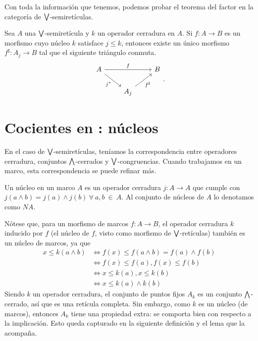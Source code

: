 Con toda la información que tenemos,
podemos probar el teorema del factor
en la categoría de $\bigvee$-semiretículas.
\begin{thm}
    Sea $A$ una $\bigvee$-semiretícula y $k$ un operador cerradura en $A$.
    Si $f:A\to B$ es un morfismo cuyo núcleo $k$ satisface $j\leq k$,
    entonces existe un único morfismo $f^\sharp:A_j\to B$ tal que
    el siguiente triángulo conmuta.
    \[
        \begin{tikzcd}
            A \ar[rr,"f"] \ar[dr,"j^*"'] &&  B \\
            &A_j \ar[ur,"f^\sharp"']
        \end{tikzcd}
    .\]
\end{thm}
    

\section{Cocientes en : núcleos}
En el caso de $\bigvee$-semiretículas, teníamos la correspondencia
entre operadores cerradura, conjuntos $\bigwedge$-cerrados
y $\bigvee$-congruencias.
Cuando trabajamos en un marco, esta correspondencia se puede refinar
más.

\begin{defn}
\label{def:nucleo}
Un núcleo en un marco $A$ es un operador cerradura $j:A \to A$ que cumple con $j(a\wedge b)=j(a)\wedge j(b) \ \forall \ a,b \ \in \ A$.
Al conjunto de núcleos de $A$ lo denotamos como $NA$.
\end{defn}

Nótese que, para un morfismo de marcos $f: A\to B$, el operador
cerradura $k$ inducido por $f$ (el núcleo de $f$, visto como morfismo
de $\bigvee$-retículas) también es un núcleo de marcos, ya que
\begin{align*}
x\leq k(a\wedge b)&\iff f(x)\leq f(a\wedge b)=f(a)\wedge f(b)\\
&\iff f(x)\leq f(a) , f(x)\leq f(b) \\
&\iff x\leq k(a), x\leq k(b)\\
& \iff x\leq k(a)\wedge k(b)
\end{align*}
Siendo $k$ un operador cerradura, el conjunto de puntos fijos $A_k$ es
un conjunto $\bigwedge$-cerrado, así que es una retícula completa. Sin
embargo, como $k$ es un núcleo (de marcos), entonces $A_k$ tiene
una propiedad extra: se comporta bien con respecto a la implicación.
Esto queda capturado en la siguiente definición y el lema que la
acompaña.

